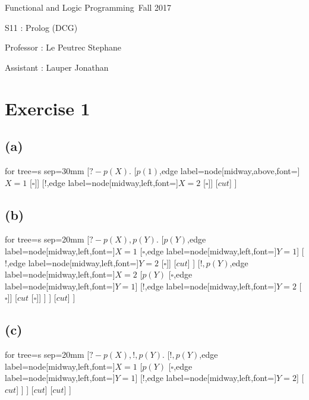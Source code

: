\documentclass[a4paper,11pt]{report}
\author{Sylvain Julmy}
\date{\today}
\newcommand*{\equal}{=}
\newcommand*{\disj}{,}
\begin{document}
\begin{center}
  \Large{
    Functional and Logic Programming\
    Fall 2017
  }
  
  \noindent\makebox[\linewidth]{\rule{\linewidth}{0.4pt}}
  S11 : Prolog (DCG)
  \noindent\makebox[\linewidth]{\rule{\linewidth}{0.4pt}}

  \begin{flushleft}
    Professor : Le Peutrec Stephane
    
    Assistant : Lauper Jonathan
  \end{flushleft}

  \noindent\makebox[\linewidth]{\rule{\textwidth}{1pt}}
\end{center}

\section*{Exercise 1}

\subsection*{(a)}
\begin{forest}
  for tree={s sep=30mm}
  [$?- p(X).$
  [$p(1)$,edge label={node[midway,above,font=\scriptsize]{$X \equal 1$}}
  [$\square$]]
  [$!$,edge label={node[midway,left,font=\scriptsize]{$X \equal 2$}}
  [$\square$]]
  [$cut$]
  ]
\end{forest}

\subsection*{(b)}
\begin{forest}
  for tree={s sep=20mm}
  [$?- p(X) \disj p(Y).$
  [$ p(Y) $,edge label={node[midway,left,font=\scriptsize]{$X \equal 1$}}
  [$\square$,edge label={node[midway,left,font=\scriptsize]{$Y \equal 1$}}]
  [$!$,edge label={node[midway,left,font=\scriptsize]{$Y \equal 2$}} [$\square$]]
  [$cut$]
  ]
  [$ ! \disj p(Y) $,edge label={node[midway,left,font=\scriptsize]{$X \equal2$}}
  [$p(Y)$
  [$\square$,edge label={node[midway,left,font=\scriptsize]{$Y \equal 1$}}]
  [$!$,edge label={node[midway,left,font=\scriptsize]{$Y \equal 2$}} [$\square$]]
  [$cut$
  [$\square$]]
  ]
  ]
  [$cut$]
  ]
\end{forest}

\subsection*{(c)}
\begin{forest}
  for tree={s sep=20mm}
  [$?- p(X) \disj ! \disj p(Y).$
  [$ ! \disj p(Y) $,edge label={node[midway,left,font=\scriptsize]{$X \equal 1$}}
  [$p(Y)$
  [$\square$,edge label={node[midway,left,font=\scriptsize]{$Y \equal 1$}}]
  [$!$,edge label={node[midway,left,font=\scriptsize]{$Y \equal 2$}}]
  [$cut$]
  ]
  ]
  [$cut$]
  [$cut$]
  ]
\end{forest}
\end{document}
